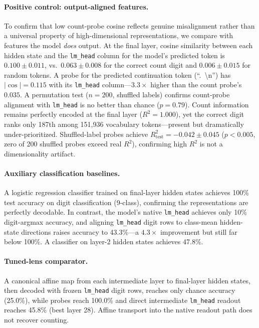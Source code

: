 \documentclass{article}
\begin{document}
\paragraph{Positive control: output-aligned features.}
To confirm that low count-probe cosine reflects genuine misalignment rather than a
universal property of high-dimensional representations, we compare with features the model
\emph{does} output.
At the final layer, cosine similarity between each hidden state and the \texttt{lm\_head} column
for the model's predicted token is $0.100 \pm 0.011$, vs.\ $0.063 \pm 0.008$ for the
correct count digit and $0.006 \pm 0.015$ for random tokens.
A probe for the predicted continuation token (``.\ \textbackslash n'') has $|\cos| = 0.115$ with its \texttt{lm\_head} column---$3.3\times$ higher than the count probe's $0.035$.
A permutation test ($n{=}200$, shuffled labels) confirms count-probe alignment
with \texttt{lm\_head} is no better than chance ($p = 0.79$).
Count information remains perfectly encoded at the final layer ($R^2 = 1.000$), yet the correct digit ranks only 187th among 151{,}936 vocabulary tokens---present but dramatically under-prioritized.
Shuffled-label probes achieve $R^2_{\text{test}} = -0.042 \pm 0.045$ ($p < 0.005$, zero of 200
shuffled probes exceed real $R^2$), confirming high $R^2$ is not a dimensionality artifact.

\paragraph{Auxiliary classification baselines.}
A logistic regression classifier trained on final-layer hidden states achieves 100\% test accuracy on digit classification (9-class),
confirming the representations are perfectly decodable.
In contrast, the model's native \texttt{lm\_head} achieves only 10\% digit-argmax accuracy,
and aligning \texttt{lm\_head} digit rows to class-mean hidden-state directions raises accuracy
to 43.3\%---a $4.3\times$ improvement but still far below 100\%.
A classifier on layer-2 hidden states achieves 47.8\%.

\paragraph{Tuned-lens comparator.}
A canonical affine map from each intermediate layer to final-layer hidden states,
then decoded with frozen \texttt{lm\_head} digit rows, reaches only chance accuracy (25.0\%),
while probes reach 100.0\% and direct intermediate \texttt{lm\_head} readout reaches 45.8\%
(best layer 28). Affine transport into the native readout path does not recover counting.
\end{document}
